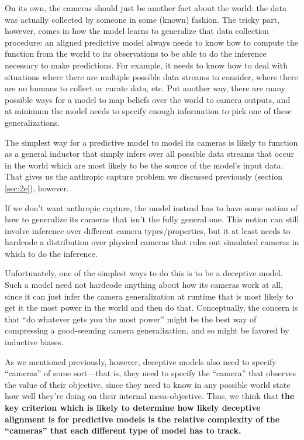 \documentclass[
  twocolumn,
  natbib,
]{miri-tech-article}
\begin{document}
On its own, the cameras should just be another fact about the world: the data was actually collected by someone in some (known) fashion. The tricky part, however, comes in how the model learns to generalize that data collection procedure: an aligned predictive model always needs to know how to compute the function from the world to its observations to be able to do the inference necessary to make predictions. For example, it needs to know how to deal with situations where there are multiple possible data streams to consider, where there are no humans to collect or curate data, etc. Put another way, there are many possible ways for a model to map beliefs over the world to camera outputs, and at minimum the model needs to specify enough information to pick one of these generalizations.

The simplest way for a predictive model to model its cameras is likely to function as a general inductor that simply infers over all possible data streams that occur in the world which are most likely to be the source of the model's input data. That gives us the anthropic capture problem we discussed previously (section \ref{sec:2e}), however.

If we don't want anthropic capture, the model instead has to have some notion of how to generalize its cameras that isn't the fully general one. This notion can still involve inference over different camera types/properties, but it at least needs to hardcode a distribution over physical cameras that rules out simulated cameras in which to do the inference.

Unfortunately, one of the simplest ways to do this is to be a deceptive model. Such a model need not hardcode anything about how its cameras work at all, since it can just infer the camera generalization at runtime that is most likely to get it the most power in the world and then do that. Conceptually, the concern is that ``do whatever gets you the most power'' might be the best way of compressing a good-seeming camera generalization, and so might be favored by inductive biases.

As we mentioned previously, however, deceptive models also need to specify ``cameras'' of some sort---that is, they need to specify the ``camera'' that observes the value of their objective, since they need to know in any possible world state how well they're doing on their internal mesa-objective. Thus, we think that \textbf{the key criterion which is likely to determine how likely deceptive alignment is for predictive models is the relative complexity of the ``cameras'' that each different type of model has to track.}
\end{document}
